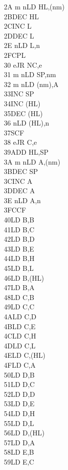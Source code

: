 \begin{multicols}{3}
{\begin{tabbing}
	2A m n\>LD HL,(nm)\\
	2B\>DEC HL\\
	2C\>INC L\\
	2D\>DEC L\\
	2E n\>LD L,n\\
	2F\>CPL\\
	30 e\>JR NC,e\\
	31 m n\>LD SP,nm\\
	32 m n\>LD (nm),A\\
	33\>INC SP\\
	34\>INC (HL)\\
	35\>DEC (HL)\\
	36 n\>LD (HL),n\\
	37\>SCF\\
	38 e\>JR C,e\\
	39\>ADD HL,SP\\
	3A m n\>LD A,(nm)\\
	3B\>DEC SP\\
	3C\>INC A\\
	3D\>DEC A\\
	3E n\>LD A,n\\
	3F\>CCF\\
	40\>LD B,B\\
	41\>LD B,C\\
	42\>LD B,D\\
	43\>LD B,E\\
	44\>LD B,H\\
	45\>LD B,L\\
	46\>LD B,(HL)\\
	47\>LD B,A\\
	48\>LD C,B\\
	49\>LD C,C\\
	4A\>LD C,D\\
	4B\>LD C,E\\
	4C\>LD C,H\\
	4D\>LD C,L\\
	4E\>LD C,(HL)\\
	4F\>LD C,A\\
	50\>LD D,B\\
	51\>LD D,C\\
	52\>LD D,D\\
	53\>LD D,E\\
	54\>LD D,H\\
	55\>LD D,L\\
	56\>LD D,(HL)\\
	57\>LD D,A\\
	58\>LD E,B\\
	59\>LD E,C\\

\end{tabbing}}
\end{multicols}
